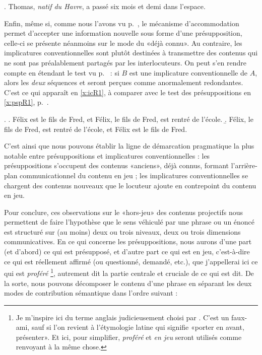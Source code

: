 \begin{refsegment}
\fussy

\ex.
Thomas, \emph{natif du Havre}, a passé six mois et demi dans l'espace.\label{x:ICa2'}


Enfin, même si, comme nous l'avons vu p.~\pageref{p.accomm}, le mécanisme d'accommodation permet d'accepter une information nouvelle sous forme d'une présupposition, celle-ci se présente néanmoins sur le mode du «déjà connu».  
Au contraire, les implicatures conventionnelles sont plutôt destinées à transmettre des contenus qui ne sont pas préalablement partagés par les interlocuteurs.  On peut s'en rendre compte en étendant le test vu p.~\pageref{p.testAB} : si $B$ est une implicature conventionnelle de $A$, alors les \emph{deux} séquences  et  seront perçues comme anormalement redondantes.  C'est ce qui apparaît en \ref{x:icR1}, à  comparer  avec le test des présuppositions en \ref{x:pspR1}, p.~\pageref{x:pspR1}.

\ex. \label{x:icR1}
\a. \juge{\zarb} Félix est le fils de Fred, et Félix, le fils de Fred, est rentré de l'école.
\b. \juge{\zarb} Félix, le fils de Fred, est rentré de l'école, et Félix est le fils de Fred.


C'est ainsi que nous pouvons établir la ligne de démarcation pragmatique la plus notable entre présuppositions et implicatures conventionnelles : les présuppositions s'occupent des contenus «anciens», déjà connus, formant l'arrière-plan communicationnel du contenu en jeu ; les implicatures conventionnelles se chargent des contenus nouveaux que le locuteur ajoute en contrepoint du contenu en jeu.


\largerpage[-1]
Pour conclure, ces observations sur le «hors-jeu» des contenus projectifs nous permettent de faire l'hypothèse que le sens véhiculé par une phrase ou un énoncé est structuré sur (au moins)  deux ou trois niveaux, deux ou trois dimensions communicatives.  
En ce qui concerne les présuppositions, nous aurons d'une part (et d'abord) ce qui est présupposé, et d'autre part ce qui est en jeu, c'est-à-dire ce qui est réellement affirmé (ou questionné, demandé, etc.), que j'appellerai ici ce qui est \emph{proféré}%
\footnote{Je m'inspire ici du terme anglais  judicieusement choisi par \citet{Roberts:96}.  C'est un faux-ami, sauf si l'on revient à l'étymologie latine qui signifie «porter en avant, présenter». Et ici, pour simplifier, \emph{proféré} et \emph{en jeu} seront utilisés comme renvoyant à la même chose.}, 
autrement dit la partie centrale et cruciale de ce qui est dit. 
De la sorte, nous pouvons décomposer le contenu d'une phrase en séparant les deux modes de contribution sémantique dans l'ordre suivant :


\end{refsegment}
